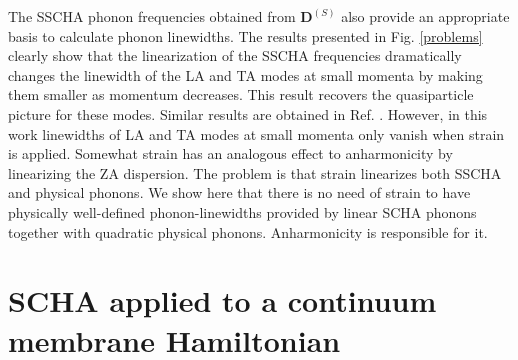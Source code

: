 The SSCHA phonon frequencies obtained from $\boldsymbol{D}^{(S)}$ also provide an appropriate basis to calculate 
phonon linewidths\cite{bianco2017second,aseginolaza2019phonon}. The results presented in Fig. \ref{problems} clearly 
show that the linearization of the SSCHA frequencies dramatically changes the linewidth of the LA and TA modes at 
small momenta by making them smaller as momentum decreases. This result recovers the quasiparticle picture for these 
modes. Similar results are obtained in Ref. \cite{bonini2012acoustic}. However, in this work linewidths of LA 
and TA modes at small momenta only vanish when strain is applied. Somewhat strain has an analogous effect to 
anharmonicity by linearizing the ZA dispersion. The problem is that strain linearizes both SSCHA and physical 
phonons. We show here that there is no need of strain to have physically well-defined phonon-linewidths provided by 
linear SCHA phonons together with quadratic physical phonons. Anharmonicity is responsible for it.

\section{SCHA applied to a continuum membrane Hamiltonian}

